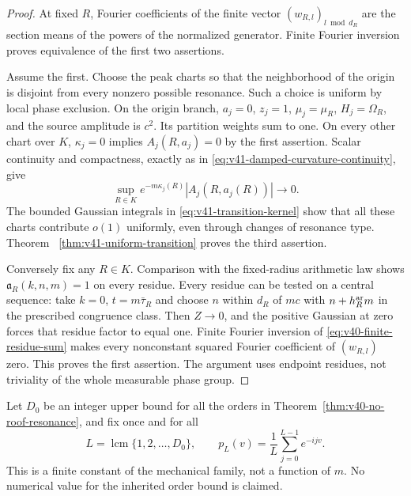 \begin{proof}
At fixed $R$, Fourier coefficients of the finite vector
$(w_{R,l})_{l\bmod d_R}$ are the section means of the powers of the
normalized generator. Finite Fourier inversion proves equivalence
of the first two assertions.

Assume the first. Choose the peak charts so that the neighborhood of
the origin is disjoint from every nonzero possible resonance. Such a
choice is uniform by local phase exclusion. On the origin branch,
$a_j=0$, $z_j=1$, $\mu_j=\mu_R$, $H_j=\Omega_R$, and the source
amplitude is $c^2$. Its partition weights sum to one. On every other
chart over $K$, $\kappa_j=0$ implies $A_j(R,a_j)=0$ by the first
assertion. Scalar continuity and compactness, exactly as in
\eqref{eq:v41-damped-curvature-continuity}, give
\[
 \sup_{R\in K}e^{-m\kappa_j(R)}|A_j(R,a_j(R))|\longrightarrow0.
\]
The bounded Gaussian integrals in
\eqref{eq:v41-transition-kernel} show that all these charts contribute
$o(1)$ uniformly, even through changes of resonance type. Theorem~
\ref{thm:v41-uniform-transition} proves the third assertion.

Conversely fix any $R\in K$. Comparison with the fixed-radius
arithmetic law shows $\mathfrak a_R(k,n,m)=1$ on every residue. Every
residue can be tested on a central sequence: take $k=0$, $t=m\bar\tau_R$
and choose $n$ within $d_R$ of $mc$ with $n+h_R^{\rm ar}m$ in the
prescribed congruence class. Then $Z\to0$, and the positive Gaussian
at zero forces that residue factor to equal one. Finite Fourier
inversion of \eqref{eq:v40-finite-residue-sum} makes every nonconstant
squared Fourier coefficient of $(w_{R,l})$ zero. This proves the first
assertion. The argument uses endpoint residues, not triviality of the
whole measurable phase group.
\end{proof}

Let $D_0$ be an integer upper bound for all the orders in
Theorem~\ref{thm:v40-no-roof-resonance}, and fix once and for all
\begin{equation}\label{eq:v41-finite-packet-length}
 L=\operatorname{lcm}\{1,2,\ldots,D_0\},\qquad
 p_L(v)=\frac1L\sum_{j=0}^{L-1}e^{-ijv}.
\end{equation}
This is a finite constant of the mechanical family, not a function of
$m$. No numerical value for the inherited order bound is claimed.

